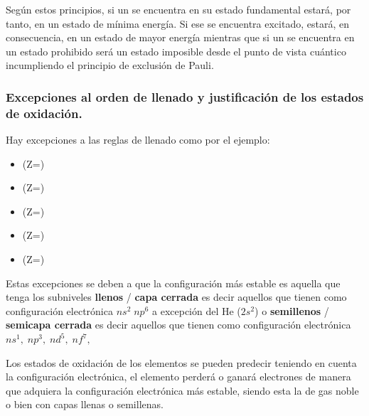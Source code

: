 Según estos principios, si un \el{} se encuentra en su estado fundamental estará, por tanto, en un estado de mínima energía.
Si ese \el{} se encuentra excitado, estará, en consecuencia, en un estado de mayor energía mientras que si un \el{} se encuentra en un estado prohibido será un estado imposible desde el punto de vista cuántico incumpliendo el principio de exclusión de Pauli.

\subsubsection{Excepciones al orden de llenado y justificación de los estados de oxidación.}

Hay excepciones a las reglas de llenado como por el ejemplo:
\begin{itemize}
    \item {}(Z=) 
    \item {}(Z=) 
    \item {}(Z=) 
    \item {}(Z=) 
    \item {}(Z=) 
\end{itemize}

Estas excepciones se deben a que la configuración más estable es aquella que tenga los subniveles \textbf{llenos} / \textbf{capa cerrada} es decir aquellos que tienen como configuración electrónica \(ns^2\;  np^6\) a excepción del He (\(2s^2\)) o \textbf{semillenos} / \textbf{semicapa cerrada} es decir aquellos que tienen como configuración electrónica \(ns^1, \; np^3, \; nd^5, \; nf^7, \;\)

Los estados de oxidación de los elementos se pueden predecir teniendo en cuenta la configuración electrónica, el elemento perderá o ganará electrones de manera que adquiera la configuración electrónica más estable, siendo esta la de gas noble o bien con capas llenas o semillenas.

